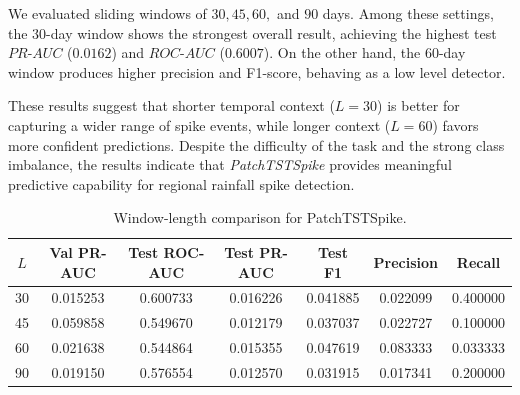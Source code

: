 \documentclass[runningheads]{llncs}
\begin{document}
We evaluated sliding windows of $30, 45, 60,$ and $90$ days. Among these settings, the $30$-day window shows the strongest overall result, achieving the highest test $PR$-$AUC$ ($0.0162$) and $ROC$-$AUC$ ($0.6007$). On the other hand, the $60$-day window produces higher precision and F1-score, behaving as a low level detector.

These results suggest that shorter temporal context ($L=30$) is better for capturing a wider range of spike events, while longer context ($L=60$) favors more confident predictions. Despite the difficulty of the task and the strong class imbalance, the results indicate that \textit{PatchTSTSpike} provides meaningful predictive capability for regional rainfall spike detection.


\begin{table}[t]
\caption{Window-length comparison for PatchTSTSpike.}
\label{tab:window_results}
\centering
\footnotesize
\setlength{\tabcolsep}{4pt}
\begin{tabular}{ccccccc}
\toprule
\textbf{$L$} & \textbf{Val PR-AUC} & \textbf{Test ROC-AUC} & \textbf{Test PR-AUC} & \textbf{Test F1} & \textbf{Precision} & \textbf{Recall} \\
\midrule
30 & 0.015253 & 0.600733 & 0.016226 & 0.041885 & 0.022099 & 0.400000 \\
45 & 0.059858 & 0.549670 & 0.012179 & 0.037037 & 0.022727 & 0.100000 \\
60 & 0.021638 & 0.544864 & 0.015355 & 0.047619 & 0.083333 & 0.033333 \\
90 & 0.019150 & 0.576554 & 0.012570 & 0.031915 & 0.017341 & 0.200000 \\
\bottomrule
\end{tabular}
\end{table}

\end{document}
